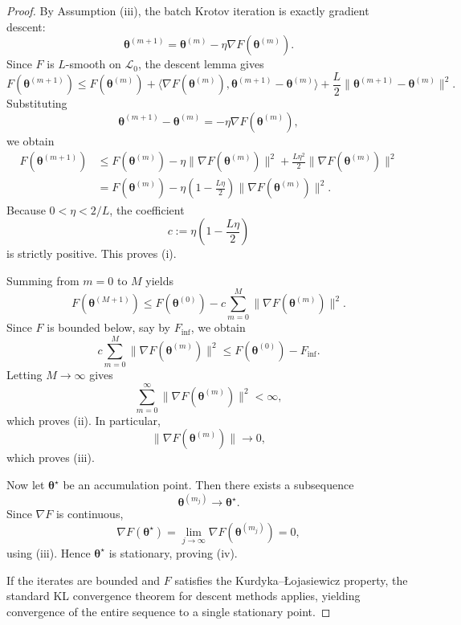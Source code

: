 \documentclass[aps,prb,10pt,twocolumn,superscriptaddress]{revtex4-2}
\begin{document}
\begin{proof}
By Assumption (iii), the batch Krotov iteration is exactly gradient descent:
\[
\bm{\theta}^{(m+1)}=\bm{\theta}^{(m)}-\eta \nabla F(\bm{\theta}^{(m)}).
\]
Since \(F\) is \(L\)-smooth on \(\mathcal{L}_0\), the descent lemma gives
\[
F(\bm{\theta}^{(m+1)})
\leq
F(\bm{\theta}^{(m)})
+
\langle \nabla F(\bm{\theta}^{(m)}),\bm{\theta}^{(m+1)}-\bm{\theta}^{(m)}\rangle
+
\frac{L}{2}\|\bm{\theta}^{(m+1)}-\bm{\theta}^{(m)}\|^2.
\]
Substituting
\[
\bm{\theta}^{(m+1)}-\bm{\theta}^{(m)}=-\eta \nabla F(\bm{\theta}^{(m)}),
\]
we obtain
\begin{align*}
F(\bm{\theta}^{(m+1)})
&\leq
F(\bm{\theta}^{(m)})
-
\eta\|\nabla F(\bm{\theta}^{(m)})\|^2
+
\frac{L\eta^2}{2}\|\nabla F(\bm{\theta}^{(m)})\|^2 \\
&=
F(\bm{\theta}^{(m)})
-
\eta\left(1-\frac{L\eta}{2}\right)\|\nabla F(\bm{\theta}^{(m)})\|^2.
\end{align*}
Because \(0<\eta<2/L\), the coefficient
\[
c:=\eta\left(1-\frac{L\eta}{2}\right)
\]
is strictly positive. This proves (i).

Summing from \(m=0\) to \(M\) yields
\[
F(\bm{\theta}^{(M+1)})
\leq
F(\bm{\theta}^{(0)})-c\sum_{m=0}^M \|\nabla F(\bm{\theta}^{(m)})\|^2.
\]
Since \(F\) is bounded below, say by \(F_{\inf}\), we obtain
\[
c\sum_{m=0}^M \|\nabla F(\bm{\theta}^{(m)})\|^2
\leq
F(\bm{\theta}^{(0)})-F_{\inf}.
\]
Letting \(M\to\infty\) gives
\[
\sum_{m=0}^{\infty}\|\nabla F(\bm{\theta}^{(m)})\|^2<\infty,
\]
which proves (ii). In particular,
\[
\|\nabla F(\bm{\theta}^{(m)})\|\to 0,
\]
which proves (iii).

Now let \(\bm{\theta}^{\star}\) be an accumulation point. Then there exists a subsequence
\[
\bm{\theta}^{(m_j)}\to \bm{\theta}^{\star}.
\]
Since \(\nabla F\) is continuous,
\[
\nabla F(\bm{\theta}^{\star})
=
\lim_{j\to\infty}\nabla F(\bm{\theta}^{(m_j)})
=
0,
\]
using (iii). Hence \(\bm{\theta}^{\star}\) is stationary, proving (iv).

If the iterates are bounded and \(F\) satisfies the Kurdyka--\L{}ojasiewicz property, the standard KL convergence theorem for descent methods applies, yielding convergence of the entire sequence to a single stationary point.
\end{proof}
\end{document}

